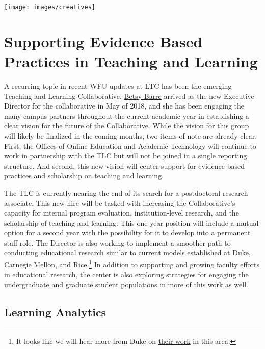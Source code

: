 \documentclass[]{tufte-handout}
\begin{document}
\begin{marginfigure}
\texttt{[image: images/creatives]} \end{marginfigure}

\section{Supporting Evidence Based Practices in Teaching and
Learning}\label{supporting-evidence-based-practices-in-teaching-and-learning}

A recurring topic in recent WFU updates at LTC has been the emerging
Teaching and Learning Collaborative.
\href{http://www.elizabethbarre.com/}{Betsy Barre} arrived as the new
Executive Director for the collaborative in May of 2018, and she has
been engaging the many campus partners throughout the current academic
year in establishing a clear vision for the future of the Collaborative.
While the vision for this group will likely be finalized in the coming
months, two items of note are already clear. First, the Offices of
Online Education and Academic Technology will continue to work in
partnership with the TLC but will not be joined in a single reporting
structure. And second, this new vision will center support for
evidence-based practices and scholarship on teaching and learning.

The TLC is currently nearing the end of its search for a postdoctoral
research associate. This new hire will be tasked with increasing the
Collaborative's capacity for internal program evaluation,
institution-level research, and the scholarship of teaching and
learning. This one-year position will include a mutual option for a
second year with the possibility for it to develop into a permanent
staff role. The Director is also working to implement a smoother path to
conducting educational research similar to current models established at
Duke, Carnegie Mellon, and Rice.\footnote{It looks like we will hear
  more from Duke on
  \href{https://mfeldstein.com/educational-research-irb-infrastructure/?elqTrackId=8f8d51420d244c22a9a0235548926b8d\&elq=e757e3a03c5b4112ae6267887dac73f8\&elqaid=22301\&elqat=1\&elqCampaignId=10980}{their
  work} in this area.} In addition to supporting and growing faculty
efforts in educational research, the center is also exploring strategies
for engaging the \href{https://ureca.wfu.edu/}{undergraduate} and
\href{https://tlc.wfu.edu/what-we-do/postdoc-ta-support/}{graduate
student} populations in more of this work as well.

\subsection{Learning Analytics}\label{learning-analytics}
\end{document}
